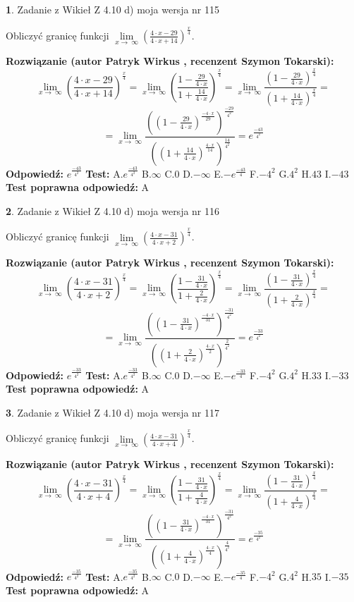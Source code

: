 \documentclass[12pt, a4paper]{article}
\theoremstyle{definition} %
\newtheorem{zad}{}
\newcommand{\zadStart}[1]{\begin{zad}#1\newline}
\newcommand{\zadStop}{\end{zad}}
\newcommand{\rozwStart}[2]{\noindent \textbf{Rozwiązanie (autor #1 , recenzent #2): }\newline}
\newcommand{\rozwStop}{\newline}
\newcommand{\odpStart}{\noindent \textbf{Odpowiedź:}\newline}
\newcommand{\odpStop}{\newline}
\newcommand{\testStart}{\noindent \textbf{Test:}\newline}
\newcommand{\testStop}{\newline}
\newcommand{\kluczStart}{\noindent \textbf{Test poprawna odpowiedź:}\newline}
\newcommand{\kluczStop}{\newline}
\begin{document}
\zadStart{Zadanie z Wikieł Z 4.10 d) moja wersja nr 115}


Obliczyć granicę funkcji  $\lim\limits_{x\to\ \infty}(\frac{4\cdot x-29}{4\cdot x+14})^{\frac{x}{4}}$.
\zadStop
\rozwStart{Patryk Wirkus}{Szymon Tokarski}
$$\lim\limits_{x\to\ \infty}(\frac{4\cdot x-29}{4\cdot x+14})^{\frac{x}{4}} = \lim\limits_{x\to\ \infty}(\frac{1-\frac{29}{4\cdot x}}{1+\frac{14}{4\cdot x}})^{\frac{x}{4}}=\lim\limits_{x\to\ \infty}\frac{(1-\frac{29}{4\cdot x})^{\frac{x}{4}}}{(1+\frac{14}{4\cdot x})^{\frac{x}{4}}}=$$
$$=\lim\limits_{x\to\ \infty}\frac{((1-\frac{29}{4\cdot x})^{\frac{-4\cdot x}{29}})^{\frac{-29}{4^{2}}}}{((1+\frac{14}{4\cdot x})^{\frac{4\cdot x}{14}})^{\frac{14}{4^{2}}}}=e^{\frac{-43}{4^{2}}}$$
\rozwStop
\odpStart
$e^{\frac{-43}{4^{2}}}$
\odpStop
\testStart
A.$e^{\frac{-43}{4^{2}}}$ B.$\infty$ C.$0$ D.$-\infty$ E.$-e^{\frac{-43}{4}}$
F.$-4^{2}$ G.$4^{2}$
H.$43$
I.$-43$
\testStop
\kluczStart
A
\kluczStop



\zadStart{Zadanie z Wikieł Z 4.10 d) moja wersja nr 116}


Obliczyć granicę funkcji  $\lim\limits_{x\to\ \infty}(\frac{4\cdot x-31}{4\cdot x+2})^{\frac{x}{4}}$.
\zadStop
\rozwStart{Patryk Wirkus}{Szymon Tokarski}
$$\lim\limits_{x\to\ \infty}(\frac{4\cdot x-31}{4\cdot x+2})^{\frac{x}{4}} = \lim\limits_{x\to\ \infty}(\frac{1-\frac{31}{4\cdot x}}{1+\frac{2}{4\cdot x}})^{\frac{x}{4}}=\lim\limits_{x\to\ \infty}\frac{(1-\frac{31}{4\cdot x})^{\frac{x}{4}}}{(1+\frac{2}{4\cdot x})^{\frac{x}{4}}}=$$
$$=\lim\limits_{x\to\ \infty}\frac{((1-\frac{31}{4\cdot x})^{\frac{-4\cdot x}{31}})^{\frac{-31}{4^{2}}}}{((1+\frac{2}{4\cdot x})^{\frac{4\cdot x}{2}})^{\frac{2}{4^{2}}}}=e^{\frac{-33}{4^{2}}}$$
\rozwStop
\odpStart
$e^{\frac{-33}{4^{2}}}$
\odpStop
\testStart
A.$e^{\frac{-33}{4^{2}}}$ B.$\infty$ C.$0$ D.$-\infty$ E.$-e^{\frac{-33}{4}}$
F.$-4^{2}$ G.$4^{2}$
H.$33$
I.$-33$
\testStop
\kluczStart
A
\kluczStop



\zadStart{Zadanie z Wikieł Z 4.10 d) moja wersja nr 117}


Obliczyć granicę funkcji  $\lim\limits_{x\to\ \infty}(\frac{4\cdot x-31}{4\cdot x+4})^{\frac{x}{4}}$.
\zadStop
\rozwStart{Patryk Wirkus}{Szymon Tokarski}
$$\lim\limits_{x\to\ \infty}(\frac{4\cdot x-31}{4\cdot x+4})^{\frac{x}{4}} = \lim\limits_{x\to\ \infty}(\frac{1-\frac{31}{4\cdot x}}{1+\frac{4}{4\cdot x}})^{\frac{x}{4}}=\lim\limits_{x\to\ \infty}\frac{(1-\frac{31}{4\cdot x})^{\frac{x}{4}}}{(1+\frac{4}{4\cdot x})^{\frac{x}{4}}}=$$
$$=\lim\limits_{x\to\ \infty}\frac{((1-\frac{31}{4\cdot x})^{\frac{-4\cdot x}{31}})^{\frac{-31}{4^{2}}}}{((1+\frac{4}{4\cdot x})^{\frac{4\cdot x}{4}})^{\frac{4}{4^{2}}}}=e^{\frac{-35}{4^{2}}}$$
\rozwStop
\odpStart
$e^{\frac{-35}{4^{2}}}$
\odpStop
\testStart
A.$e^{\frac{-35}{4^{2}}}$ B.$\infty$ C.$0$ D.$-\infty$ E.$-e^{\frac{-35}{4}}$
F.$-4^{2}$ G.$4^{2}$
H.$35$
I.$-35$
\testStop
\kluczStart
A
\kluczStop
\end{document}
